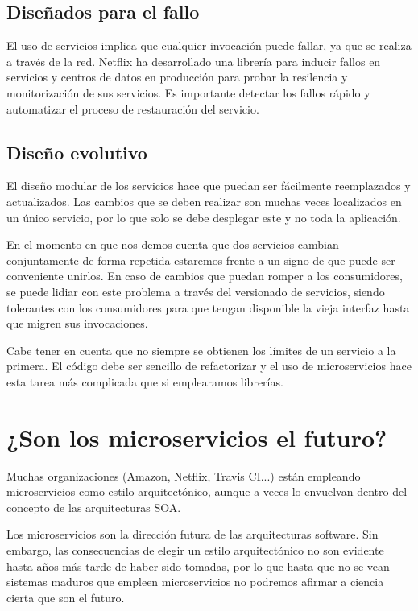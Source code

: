 \documentclass[11pt,a4paper]{article}
\begin{document}
\subsection{Diseñados para el fallo}

El uso de servicios implica que cualquier invocación puede fallar, ya que se realiza a través de la red. Netflix ha desarrollado una librería para inducir fallos en servicios y centros de datos en producción para probar la resilencia y monitorización de sus servicios. Es importante detectar los fallos rápido y automatizar el proceso de restauración del servicio.

\subsection{Diseño evolutivo}

El diseño modular de los servicios hace que puedan ser fácilmente reemplazados y actualizados. Las cambios que se deben realizar son muchas veces localizados en un único servicio, por lo que solo se debe desplegar este y no toda la aplicación. 

En el momento en que nos demos cuenta que dos servicios cambian conjuntamente de forma repetida estaremos frente a un signo de que puede ser conveniente unirlos. En caso de cambios que puedan romper a los consumidores, se puede lidiar con este problema a través del versionado de servicios, siendo tolerantes con los consumidores para que tengan disponible la vieja interfaz hasta que migren sus invocaciones.

Cabe tener en cuenta que no siempre se obtienen los límites de un servicio a la primera. El código debe ser sencillo de refactorizar y el uso de microservicios hace esta tarea más complicada que si emplearamos librerías.

\section{¿Son los microservicios el futuro?}

Muchas organizaciones (Amazon, Netflix, Travis CI...) están empleando microservicios como estilo arquitectónico, aunque a veces lo envuelvan dentro del concepto de las arquitecturas SOA.

Los microservicios son la dirección futura de las arquitecturas software. Sin embargo, las consecuencias de elegir un estilo arquitectónico no son evidente hasta años más tarde de haber sido tomadas, por lo que hasta que no se vean sistemas maduros que empleen microservicios no podremos afirmar a ciencia cierta que son el futuro.
\end{document}
